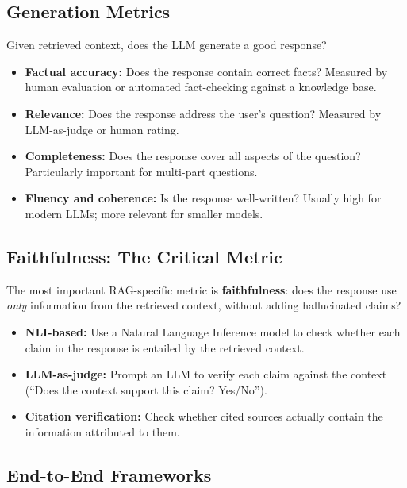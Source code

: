 \subsection{Generation Metrics}

Given retrieved context, does the LLM generate a good response?

\begin{itemize}
    \item \textbf{Factual accuracy:} Does the response contain correct facts?
          Measured by human evaluation or automated fact-checking against a
          knowledge base.
    \item \textbf{Relevance:} Does the response address the user's question?
          Measured by LLM-as-judge or human rating.
    \item \textbf{Completeness:} Does the response cover all aspects of the
          question?  Particularly important for multi-part questions.
    \item \textbf{Fluency and coherence:} Is the response well-written?
          Usually high for modern LLMs; more relevant for smaller models.
\end{itemize}

\subsection{Faithfulness: The Critical Metric}

The most important RAG-specific metric is \textbf{faithfulness}: does the
response use \emph{only} information from the retrieved context, without
adding hallucinated claims?

\begin{itemize}
    \item \textbf{NLI-based:} Use a Natural Language Inference model to check
          whether each claim in the response is entailed by the retrieved
          context.
    \item \textbf{LLM-as-judge:} Prompt an LLM to verify each claim against
          the context (``Does the context support this claim? Yes/No'').
    \item \textbf{Citation verification:} Check whether cited sources actually
          contain the information attributed to them.
\end{itemize}

\subsection{End-to-End Frameworks}

